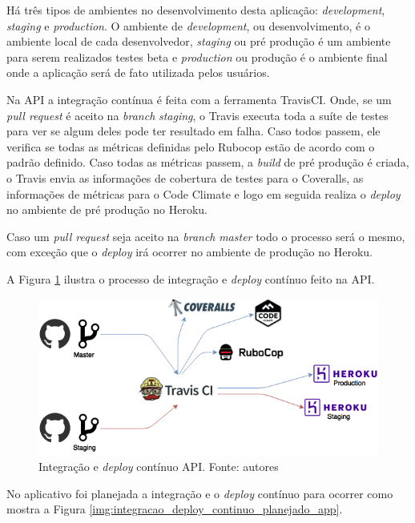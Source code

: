 Há três tipos de ambientes no desenvolvimento desta aplicação: \textit{development}, \textit{staging} e \textit{production}. O ambiente de \textit{development}, ou desenvolvimento, é o ambiente local de cada desenvolvedor, \textit{staging} ou pré produção é um ambiente para serem realizados testes beta e \textit{production} ou produção é o ambiente final onde a aplicação será de fato utilizada pelos usuários.

Na API a integração contínua é feita com a ferramenta TravisCI. Onde, se um \textit{pull request} é aceito na \textit{branch} \textit{staging}, o Travis executa toda a suíte de testes para ver se algum deles pode ter resultado em falha. Caso todos passem, ele verifica se todas as métricas definidas pelo Rubocop estão de acordo com o padrão definido. Caso todas as métricas passem, a \textit{build} de pré produção é criada, o Travis envia as informações de cobertura de testes para o Coveralls, as informações de métricas para o Code Climate e logo em seguida realiza o \textit{deploy} no ambiente de pré produção no Heroku.

Caso um \textit{pull request} seja aceito na \textit{branch} \textit{master} todo o processo será o mesmo, com exceção que o \textit{deploy} irá ocorrer no ambiente de produção no Heroku.

A Figura \ref{img:integracao_deploy_continuo_api} ilustra o processo de integração e \textit{deploy} contínuo feito na API.

\begin{figure}[H]
    \centering
    \includegraphics[scale=0.5]{figuras/api_ci.png}
    \caption[Integração e \textit{deploy} contínuo API]{Integração e \textit{deploy} contínuo API. Fonte: autores}
    \label{img:integracao_deploy_continuo_api}
\end{figure}

No aplicativo foi planejada a integração e o \textit{deploy} contínuo para ocorrer como mostra a Figura \ref{img:integracao_deploy_continuo_planejado_app}.

